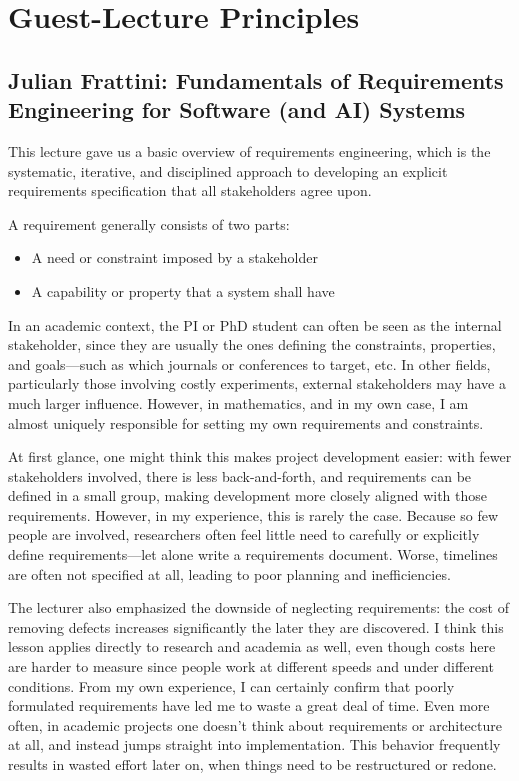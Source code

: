 \documentclass[11pt,a4paper]{article}
\begin{document}
\section{Guest-Lecture Principles}

\subsection{Julian Frattini: Fundamentals of Requirements
Engineering for Software (and AI) Systems}
This lecture gave us a basic overview of requirements engineering, which is the systematic, iterative, and disciplined approach to developing an explicit requirements specification that all stakeholders agree upon.

A requirement generally consists of two parts:
\begin{itemize}
\item A need or constraint imposed by a stakeholder
\item A capability or property that a system shall have
\end{itemize}

In an academic context, the PI or PhD student can often be seen as the internal stakeholder, since they are usually the ones defining the constraints, properties, and goals—such as which journals or conferences to target, etc. In other fields, particularly those involving costly experiments, external stakeholders may have a much larger influence. However, in mathematics, and in my own case, I am almost uniquely responsible for setting my own requirements and constraints.

At first glance, one might think this makes project development easier: with fewer stakeholders involved, there is less back-and-forth, and requirements can be defined in a small group, making development more closely aligned with those requirements. However, in my experience, this is rarely the case. Because so few people are involved, researchers often feel little need to carefully or explicitly define requirements—let alone write a requirements document. Worse, timelines are often not specified at all, leading to poor planning and inefficiencies.

The lecturer also emphasized the downside of neglecting requirements: the cost of removing defects increases significantly the later they are discovered. I think this lesson applies directly to research and academia as well, even though costs here are harder to measure since people work at different speeds and under different conditions. From my own experience, I can certainly confirm that poorly formulated requirements have led me to waste a great deal of time. Even more often, in academic projects one doesn’t think about requirements or architecture at all, and instead jumps straight into implementation. This behavior frequently results in wasted effort later on, when things need to be restructured or redone.
\end{document}
